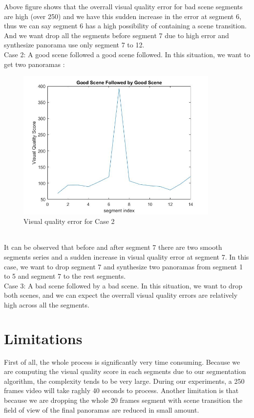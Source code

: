 \documentclass[12pt]{article}
\begin{document}
Above figure shows that the overrall visual quality error for bad scene segments are high (over 250) and we have this sudden increase in the error at segment 6, thus we can say segment 6 has a high possibility of containing a scene transition. And we want drop all the segments before segment 7 due to high error and synthesize panorama use only segment 7 to 12.\\
Case 2: A good scene followed a good scene followed. In this situation, we want to get two panoramas :
\begin{figure}[h]
	\centering
	\includegraphics[width=10cm]{good-good-fig}
	\caption{Visual quality error for Case 2}
\end{figure}\\

It can be observed that before and after segment 7 there are two smooth segments series and a sudden increase in visual quality error at segment 7. In this case, we want to drop segment 7 and synthesize two panoramas from segment 1 to 5 and segment 7 to the rest segments.\\
Case 3: A bad scene followed by a bad scene. In this situation, we want to drop both scenes, and we can expect the overrall visual quality errors are relatively high across all the segments.
\section{Limitations}
First of all, the whole process is significantly very time consuming. Because we are computing the visual quality score in each segments due to our segmentation algorithm, the complexity tends to be very large. During our experiments, a 250 frames video will take raghly 40 seconds to process. Another limitation is that because we are dropping the whole 20 frames segment with scene transition the field of view of the final panoramas are reduced in small amount. 
\end{document}
